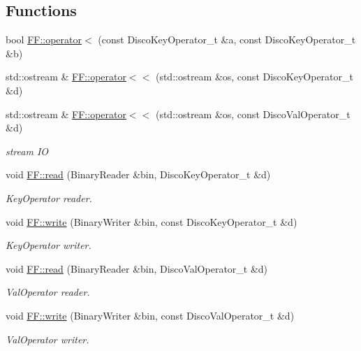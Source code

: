 \subsection*{Functions}
\begin{DoxyCompactItemize}
\item 
bool \mbox{\hyperlink{namespaceFF_a84e77b5ad9222ac85655c36949abf276}{F\+F\+::operator$<$}} (const Disco\+Key\+Operator\+\_\+t \&a, const Disco\+Key\+Operator\+\_\+t \&b)
\item 
std\+::ostream \& \mbox{\hyperlink{namespaceFF_ac2ee6d46f8316f1f3631105fbeab604c}{F\+F\+::operator$<$$<$}} (std\+::ostream \&os, const Disco\+Key\+Operator\+\_\+t \&d)
\item 
std\+::ostream \& \mbox{\hyperlink{namespaceFF_a16521aca33d733f874a91677f71769e5}{F\+F\+::operator$<$$<$}} (std\+::ostream \&os, const Disco\+Val\+Operator\+\_\+t \&d)
\begin{DoxyCompactList}\small\item\em stream IO \end{DoxyCompactList}\item 
void \mbox{\hyperlink{namespaceFF_a90d854af01e30d52191dff4341fcd4ad}{F\+F\+::read}} (Binary\+Reader \&bin, Disco\+Key\+Operator\+\_\+t \&d)
\begin{DoxyCompactList}\small\item\em Key\+Operator reader. \end{DoxyCompactList}\item 
void \mbox{\hyperlink{namespaceFF_a5c3e38934ee51ae23bc9d39dca34acc1}{F\+F\+::write}} (Binary\+Writer \&bin, const Disco\+Key\+Operator\+\_\+t \&d)
\begin{DoxyCompactList}\small\item\em Key\+Operator writer. \end{DoxyCompactList}\item 
void \mbox{\hyperlink{namespaceFF_adbbf0211a7578841555412497b4f18c4}{F\+F\+::read}} (Binary\+Reader \&bin, Disco\+Val\+Operator\+\_\+t \&d)
\begin{DoxyCompactList}\small\item\em Val\+Operator reader. \end{DoxyCompactList}\item 
void \mbox{\hyperlink{namespaceFF_a6906b2ce111930a390f4a8e81b1730b6}{F\+F\+::write}} (Binary\+Writer \&bin, const Disco\+Val\+Operator\+\_\+t \&d)
\begin{DoxyCompactList}\small\item\em Val\+Operator writer. \end{DoxyCompactList}\item 

\end{DoxyCompactItemize}

